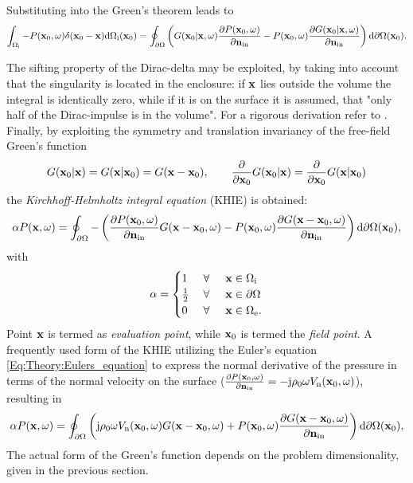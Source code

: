 Substituting into the Green's theorem leads to
\begin{equation}
\small
\int_{\Omega_{\mathrm{i}}} - P(\mathbf{x}_0,\omega) \delta(\mathbf{x}_0 - \mathbf{x})
  \mathrm{d} \Omega_{\mathrm{i}}(\mathbf{x}_0) = 
\oint_{\partial \Omega}  \left(  G(\mathbf{x}_0|\mathbf{x},\omega) \frac{\partial P(\mathbf{x}_0,\omega)}{\partial \mathbf{n}_{\mathrm{in}}}  - P(\mathbf{x}_0,\omega)  \frac{\partial G(\mathbf{x}_0|\mathbf{x},\omega)}{\partial \mathbf{n}_{\mathrm{in}}}  \right)   \mathrm{d} \partial \Omega(\mathbf{x}_0).
\end{equation}

The sifting property of the Dirac-delta may be exploited, by taking into account that the singularity is located in the enclosure: if $\mathbf{x}$ lies outside the volume the integral is identically zero, while if it is on the surface it is assumed, that "only half of the Dirac-impulse is in the volume". {\color{red}For a rigorous derivation refer to \cite{}}.
Finally, by exploiting the symmetry and translation invariancy of the free-field Green's function
\begin{equation}
G(\mathbf{x}_0|\mathbf{x}) = G(\mathbf{x}|\mathbf{x}_0) = G(\mathbf{x}-\mathbf{x}_0), \qquad
\frac{\partial}{\partial \mathbf{x}_0} G(\mathbf{x}_0|\mathbf{x})= \frac{\partial}{\partial \mathbf{x}_0} G(\mathbf{x}|\mathbf{x}_0)
\end{equation}
the \emph{Kirchhoff-Helmholtz integral equation} (KHIE) is obtained:
\begin{equation}
\alpha P(\mathbf{x},\omega) = 
\oint_{\partial \Omega} - \left( 
\frac{\partial P(\mathbf{x}_0,\omega)}{\partial \mathbf{n}_{\mathrm{in}}} G(\mathbf{x}-\mathbf{x}_0,\omega)
-
P(\mathbf{x}_0,\omega)  \frac{\partial G(\mathbf{x}-\mathbf{x}_0,\omega)}{\partial\mathbf{n}_{\mathrm{in}}} 
\right)   \mathrm{d} \partial \Omega( \mathbf{x}_0),
\label{Eq:Theory:Kirchhoff-Helmholtz}
\end{equation}
with
\begin{equation*}
\alpha = \begin{cases} 
1           & \hspace{1mm} \forall \hspace{5mm}  \mathbf{x} \in \Omega_{\mathrm{i}}  	   \\
\frac{1}{2} & \hspace{1mm} \forall \hspace{5mm}  \mathbf{x} \in \partial \Omega  \\
0 			& \hspace{1mm} \forall \hspace{5mm}  \mathbf{x} \in \Omega_{\mathrm{e}}.
\end{cases}
\end{equation*}
Point $\mathbf{x}$ is termed as \emph{evaluation point}, while $\mathbf{x}_0$ is termed the \emph{field point}. A frequently used form of the KHIE utilizing the Euler's equation \eqref{Eq:Theory:Eulers_equation} to express the normal derivative of the pressure in terms of the normal velocity on the surface ($\frac{\partial P(\mathbf{x}_0,\omega)}{\partial \mathbf{n}_{\mathrm{in}}} = -\mathrm{j} \rho_0 \omega V_{\mathrm{n}}(\mathbf{x}_0,\omega)$), resulting in
\begin{equation}
\alpha P(\mathbf{x},\omega) = 
\oint_{\partial \Omega}  \left(  
\mathrm{j} \rho_0 \omega V_{\mathrm{n}}(\mathbf{x}_0,\omega) G(\mathbf{x}-\mathbf{x}_0,\omega) 
+
P(\mathbf{x}_0,\omega)  \frac{\partial G(\mathbf{x}-\mathbf{x}_0,\omega)}{\partial \mathbf{n}_{\mathrm{in}}}
\right)   \mathrm{d} \partial \Omega(\mathbf{x}_0),
\label{Eq:Theory:Kirchhoff}
\end{equation}
The actual form of the Green's function depends on the problem dimensionality, given in the previous section.

